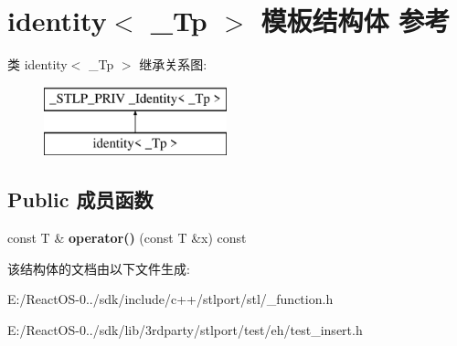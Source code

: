 \hypertarget{structidentity}{}\section{identity$<$ \+\_\+\+Tp $>$ 模板结构体 参考}
\label{structidentity}
类 identity$<$ \+\_\+\+Tp $>$ 继承关系图\+:\begin{figure}[H]
\begin{center}
\leavevmode
\includegraphics[height=2.000000cm]{structidentity}
\end{center}
\end{figure}
\subsection*{Public 成员函数}
\begin{DoxyCompactItemize}
\item 
\mbox{\label{structidentity_ac43250c10516dfeff6dd6f7536276829}} 
const T \& {\bfseries operator()} (const T \&x) const
\end{DoxyCompactItemize}


该结构体的文档由以下文件生成\+:\begin{DoxyCompactItemize}
\item 
E\+:/\+React\+O\+S-\/0../sdk/include/c++/stlport/stl/\+\_\+function.\+h\item 
E\+:/\+React\+O\+S-\/0../sdk/lib/3rdparty/stlport/test/eh/test\+\_\+insert.\+h\end{DoxyCompactItemize}
